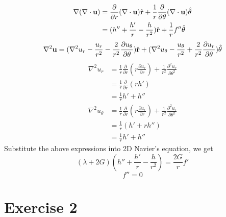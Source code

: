 \documentclass[12pt]{article}
\newcommand{\rr}{{\bf r}}
\newcommand{\uu}{{\bf u}}
\newcommand{\bnabla}{{\bf \nabla}}
\newcommand{\btheta}{{\mathbf \theta}}
\newcommand{\pr}{{\partial}}
\begin{document}
\begin{align*}
  \bnabla (\nabla \cdot\uu) &= \frac{\pr}{\pr r} (\nabla\cdot\uu)\hat\rr + \frac 1 r \frac{\pr}{\pr \theta}(\nabla\cdot\uu)\hat{\btheta} \\
  &=(h'' + \frac{h'}{r} - \frac{h}{r^2})\hat\rr + \frac 1 r f''\hat\btheta
\end{align*}
\[
  \nabla^2 \uu = (\nabla^2u_r - \frac{u_r}{r^2} - \frac{2}{r^2} \frac{\pr u_{\theta}}{\pr {\theta}}) \hat \rr + (\nabla^2 u_{\theta} - \frac{u_{\theta}}{r^2} +
  \frac{2}{r^2}\frac{\pr u_r}{\pr \theta})\hat \theta
\]
\begin{align*}
  \nabla^2u_r &= \frac 1 r \frac{\pr}{\pr r} (r\frac{\pr u_r}{\pr r}) + \frac{1}{r^2}\frac{\pr^2 u_r}{\pr \theta^2}\\
  &=\frac 1 r \frac{\pr}{\pr r} (rh')\\
  &=\frac 1 r h' + h''
\end{align*}
\begin{align*}
  \nabla^2u_{\theta} &= \frac 1 r \frac{\pr}{\pr r} (r\frac{\pr u_r}{\pr r}) + \frac{1}{r^2}\frac{\pr^2 u_r}{\pr \theta^2}\\
  &= \frac 1 r (h' + rh'')\\
  &= \frac 1 r h' + h''
\end{align*}
Substitute the above expressions into 2D Navier's equation, we get
\begin{equation}
  (\lambda+ 2G)(h'' + \frac{h'}{r} - \frac{h}{r^2}) = \frac{2G}{r}f'
\end{equation}
\begin{equation}
  f''=0
\end{equation}




\section{Exercise 2}
\end{document}
